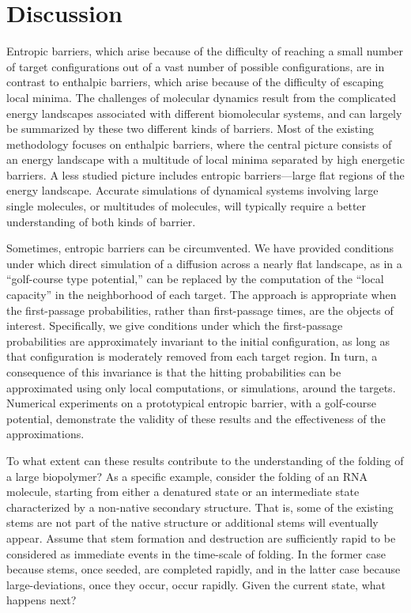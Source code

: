 \documentclass[12pt, nofootinbib,english, amsmath, amssymb, aps, priprint, graphicx,floatfix]{revtex4-1}
\theoremstyle{plain}
\theoremstyle{definition}
\theoremstyle{plain}
\begin{document}
\section{Discussion} 
\label{sec:Discussion}


Entropic barriers, which arise because of the difficulty of reaching a small number of target configurations out of a vast number of possible configurations, are in contrast to enthalpic barriers, which arise because of the difficulty of escaping local minima. The challenges of molecular dynamics result from the complicated energy landscapes associated with different biomolecular systems, and can largely be summarized by these two different kinds of barriers. Most of the existing methodology focuses on enthalpic barriers, where the central picture consists of an energy landscape with a multitude of local minima separated by high energetic barriers. A less studied picture includes entropic barriers---large 
flat regions of the energy landscape. Accurate simulations of  dynamical systems involving large single molecules, or multitudes of molecules, will typically require a better understanding of both kinds of barrier.

Sometimes, entropic barriers can be circumvented. We have provided conditions under which direct simulation of a diffusion across a nearly flat landscape, as in a ``golf-course type potential,'' can be 
replaced by the computation of the ``local capacity'' in the neighborhood of each target. The approach is appropriate when the first-passage probabilities, rather than first-passage times, are the objects of interest. Specifically, we give conditions 
under which the first-passage probabilities are approximately invariant to the initial configuration, as long as that configuration is moderately removed from each target region. In turn, a consequence of this invariance is that the hitting probabilities can be approximated using only local computations, or simulations, around the targets.  Numerical experiments on a prototypical entropic barrier, with a golf-course potential, demonstrate the validity of these results and the effectiveness of the approximations.

To what extent can these results contribute to the understanding of the folding of a large biopolymer? As a specific example, consider the folding of an RNA molecule, starting from either a denatured state or an intermediate state characterized by a non-native secondary structure. That is, some of the existing stems are not part of the native structure or additional stems will eventually appear. Assume that stem formation and destruction are sufficiently rapid to be considered as immediate events in the time-scale of folding. In the former case because stems, once seeded, are completed 
rapidly\cite{Porschke1977-xz}, and in the latter case because large-deviations, once they occur, occur rapidly. 
Given the current state, what happens next? 
\end{document}
